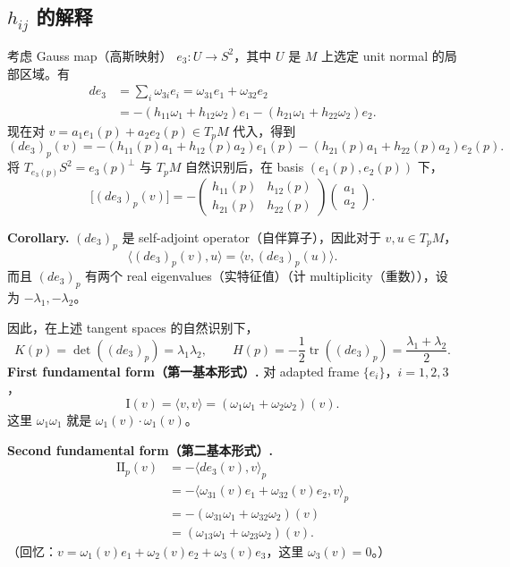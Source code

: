\documentclass[UTF8,11pt,a4paper]{ctexart}
\begin{document}
\subsection*{$h_{ij}$ 的解释}
考虑 Gauss map（高斯映射） $e_3\colon U\longrightarrow S^2$，其中 $U$ 是 $M$ 上选定 unit normal 的局部区域。有
\begin{align*}
de_3
&=\sum_i\omega_{3i}e_i
=\omega_{31}e_1+\omega_{32}e_2\\
&=-(h_{11}\omega_1+h_{12}\omega_2)e_1
  -(h_{21}\omega_1+h_{22}\omega_2)e_2.
\end{align*}
现在对 $v=a_1e_1(p)+a_2e_2(p)\in T_pM$ 代入，得到
\[
(de_3)_p(v)
=-(h_{11}(p)a_1+h_{12}(p)a_2)e_1(p)
 -(h_{21}(p)a_1+h_{22}(p)a_2)e_2(p).
\]
将 $T_{e_3(p)}S^2=e_3(p)^\perp$ 与 $T_pM$ 自然识别后，在 basis $(e_1(p),e_2(p))$ 下，
\[
\bigl[(de_3)_p(v)\bigr]
=-\begin{pmatrix}
h_{11}(p)&h_{12}(p)\\
h_{21}(p)&h_{22}(p)
\end{pmatrix}
\begin{pmatrix}a_1\\a_2\end{pmatrix}.
\]

\textbf{Corollary.} $(de_3)_p$ 是 self-adjoint operator（自伴算子），因此对于 $v,u\in T_pM$，
\[
\langle(de_3)_p(v),u\rangle
=\langle v,(de_3)_p(u)\rangle.
\]
而且 $(de_3)_p$ 有两个 real eigenvalues（实特征值）（计 multiplicity（重数）），设为 $-\lambda_1,-\lambda_2$。

因此，在上述 tangent spaces 的自然识别下，
\[
K(p)=\det((de_3)_p)=\lambda_1\lambda_2,
\qquad
H(p)=-\frac12\operatorname{tr}((de_3)_p)
=\frac{\lambda_1+\lambda_2}{2}.
\]
\medskip
\textbf{First fundamental form（第一基本形式）.} 对 adapted frame $\{e_i\}$，$i=1,2,3$，
\[
\mathrm{I}(v)=\langle v,v\rangle
=(\omega_1\omega_1+\omega_2\omega_2)(v).
\]
这里 $\omega_1\omega_1$ 就是 $\omega_1(v)\cdot\omega_1(v)$。

\textbf{Second fundamental form（第二基本形式）.}
\begin{align*}
\mathrm{II}_p(v)
&=-\langle de_3(v),v\rangle_p\\
&=-\langle\omega_{31}(v)e_1+\omega_{32}(v)e_2,v\rangle_p\\
&=-(\omega_{31}\omega_1+\omega_{32}\omega_2)(v)\\
&=(\omega_{13}\omega_1+\omega_{23}\omega_2)(v).
\end{align*}
（回忆：$v=\omega_1(v)e_1+\omega_2(v)e_2+\omega_3(v)e_3$，这里 $\omega_3(v)=0$。）
\end{document}
